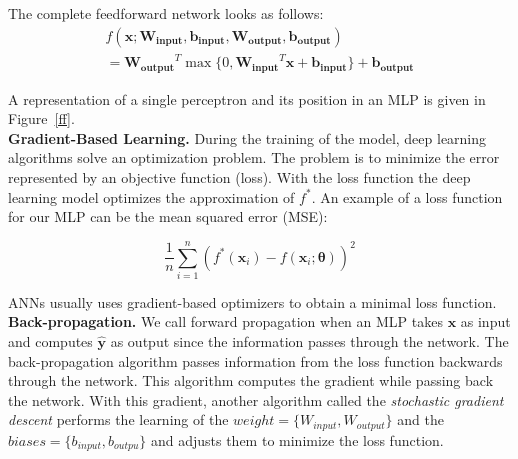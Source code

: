 The complete feedforward network looks as follows:
\begin{equation} 
  \begin{split}
  f(\bm{x;W_{input},b_{input},W_{output},b_{output}}) \\
  = \bm{W_{output}}^{T}\max\{0,\bm{W_{input}}^{T}\bm{x+b_{input}}\}+\bm{b_{output}}
\end{split}
\end{equation}

A representation of a single perceptron and its position in an MLP is given in
Figure~\ref{ff}.\\



\textbf{Gradient-Based Learning.} During the training of the model, deep
learning algorithms solve an optimization problem. The problem is to minimize
the error represented by an objective function (loss).  With the loss function
the deep learning model optimizes the approximation of $f^{*}$. An example of a
loss function for our MLP can be the mean squared error (MSE):

\begin{equation} 
  \frac{1}{n}\sum_{i=1}^n(f^*(\bm x_i)-f(\bm x_i;\bm{\theta}))^2
\end{equation}

ANNs usually uses gradient-based optimizers to obtain a minimal loss function.\\


\textbf{Back-propagation.} We call forward propagation when an MLP takes
$\bm{x}$ as input and computes $\bm{\hat{y}}$ as output since the information
passes through the network. The back-propagation algorithm passes information
from the loss function backwards through the network. This algorithm computes
the gradient while passing back the network. With this gradient, another
algorithm called the \textit{stochastic gradient descent} performs the learning
of the $weight = \{W_{input},W_{output}\}$ and the $biases =
\{b_{input},b_{outpu}\}$ and adjusts them to minimize the loss function.
